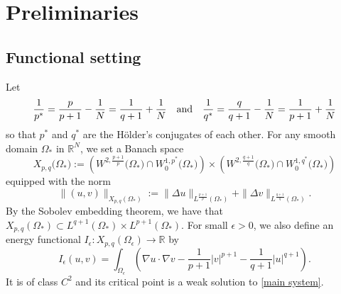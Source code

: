 \documentclass[reqno]{amsart}
\theoremstyle{remark}
\newcommand{\ep}{\epsilon}
\newcommand{\R}{\mathbb{R}}
\newcommand{\oms}{\Omega_*}
\renewcommand{\(}{\left(}
\renewcommand{\)}{\right)}
\numberwithin{equation}{section}
\begin{document}
\section{Preliminaries}\label{sec pre}
\subsection{Functional setting}
Let
\begin{equation}\label{pq star}
\frac{1}{p^\ast} = \frac{p}{p+1} - \frac{1}{N} = \frac{1}{q+1} + \frac{1}{N}
\quad \textup{and} \quad
\frac{1}{q^\ast} = \frac{q}{q+1} - \frac{1}{N} = \frac{1}{p+1} + \frac{1}{N}
\end{equation}
so that $p^\ast$ and $q^\ast$ are the H\"older's conjugates of each other. For any smooth domain $\oms$ in $\R^N$, we set a Banach space
\begin{equation}\label{X pq}
X_{p,q}\big(\oms\big) := \(W^{2,\frac{p+1}{p}}\big(\oms\big) \cap W_0^{1,p^\ast}\big(\oms\big)\) \times \(W^{2,\frac{q+1}{q}}\big(\oms\big) \cap W_0^{1,q^\ast}\big(\oms\big)\)
\end{equation}
equipped with the norm
$$
\|(u,v)\|_{X_{p,q}(\oms)} := \|\Delta u\|_{L^{\frac{p+1}{p}}(\oms)} + \|\Delta v\|_{L^{\frac{q+1}{q}}(\oms)}.
$$
By the Sobolev embedding theorem, we have that $X_{p,q}(\oms) \subset L^{q+1}(\oms) \times L^{p+1}(\oms)$.
For small $\ep > 0$, we also define an energy functional $I_\ep:X_{p,q}(\Omega_\ep) \to \R$ by
\begin{equation}\label{ene}
I_\ep(u,v) = \int_{\Omega_\ep} \(\nabla u\cdot \nabla v-\frac{1}{p+1}|v|^{p+1}-\frac{1}{q+1}|u|^{q+1}\).
\end{equation}
It is of class $C^2$ and its critical point is a weak solution to \eqref{main system}.
\end{document}
